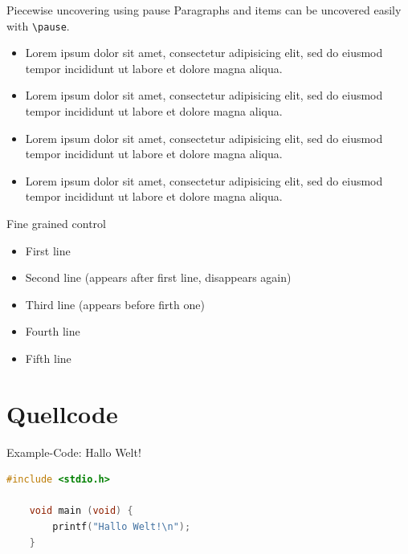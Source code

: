 \documentclass[10pt, aspectratio=1610]{beamer}
\begin{document}
\begin{frame}{Piecewise uncovering using pause}
	Paragraphs and items can be uncovered easily with \texttt{\textbackslash pause}.
	\pause
	\begin{itemize}
		\item Lorem ipsum dolor sit amet, consectetur adipisicing elit, sed do eiusmod tempor incididunt ut labore et dolore magna aliqua. 
			\pause
		\item Lorem ipsum dolor sit amet, consectetur adipisicing elit, sed do eiusmod tempor incididunt ut labore et dolore magna aliqua. 
			\pause
		\item Lorem ipsum dolor sit amet, consectetur adipisicing elit, sed do eiusmod tempor incididunt ut labore et dolore magna aliqua. 
			\pause
		\item Lorem ipsum dolor sit amet, consectetur adipisicing elit, sed do eiusmod tempor incididunt ut labore et dolore magna aliqua. 
	\end{itemize}
\end{frame}

\begin{frame}{Fine grained control}
	\begin{itemize}
		\item<1-> First line
		\item<2>  Second line (appears after first line, disappears again)
		\item<3-4> Third line (appears before firth one)
		\item<4-> Fourth line
		\item<5-> Fifth line
	\end{itemize}

\end{frame}

\section{Quellcode}

\begin{frame}[fragile]{Example-Code: Hallo Welt!}
	\begin{lstlisting}[basicstyle=\ttfamily, language=C]
	#include <stdio.h>

	void main (void) {
	    printf("Hallo Welt!\n");
	}
	\end{lstlisting}
\end{frame}
\end{document}
